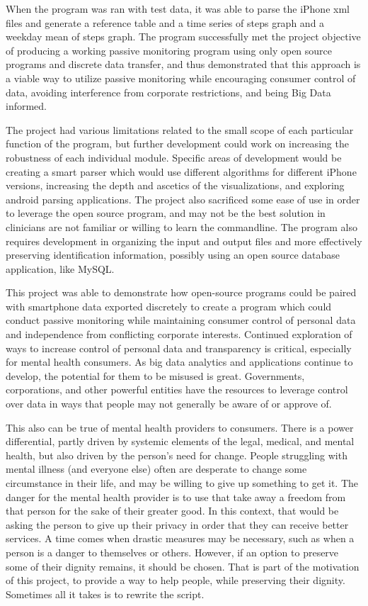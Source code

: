 \documentclass[sigconf]{acmart}
\begin{document}
When the program was ran with test data, it was able to parse the iPhone xml files and generate a reference table and a time series of steps graph and a weekday mean of steps graph. The program successfully met the project objective of producing a working passive monitoring program using only open source programs and discrete data transfer, and thus demonstrated that this approach is a viable way to utilize passive monitoring while encouraging consumer control of data, avoiding interference from corporate restrictions, and being Big Data informed. 

The project had various limitations related to the small scope of each particular function of the program, but further development could work on increasing the robustness of each individual module. Specific areas of development would be creating a smart parser which would use different algorithms for different iPhone versions, increasing the depth and ascetics of the visualizations, and exploring android parsing applications. 
The project also sacrificed some ease of use in order to leverage the open source program, and may not be the best solution in clinicians are not familiar or willing to learn the commandline. The program also requires development in organizing the input and output files and more effectively preserving identification information, possibly using an open source database application, like MySQL. 

This project was able to demonstrate how open-source programs could be paired with smartphone data exported discretely to create a program which could conduct passive monitoring while maintaining consumer control of personal data and independence from conflicting corporate interests. Continued exploration of ways to increase control of personal data and transparency is critical, especially for mental health consumers. As big data analytics and applications continue to develop, the potential for them to be misused is great. Governments, corporations, and other powerful entities have the resources to leverage control over data in ways that people may not generally be aware of or approve of. 

This also can be true of mental health providers to consumers. There is a power differential, partly driven by systemic elements of the legal, medical, and mental health, but also driven by the person's need for change. People struggling with mental illness (and everyone else) often are desperate to change some circumstance in their life, and may be willing to give up something to get it. The danger for the mental health provider is to use that take away a freedom from that person for the sake of their greater good. In this context, that would be asking the person to give up their privacy in order that they can receive better services. A time comes when drastic measures may be necessary, such as when a person is a danger to themselves or others. However, if an option to preserve some of their dignity remains, it should be chosen. That is part of the motivation of this project, to provide a way to help people, while preserving their dignity. Sometimes all it takes is to rewrite the script. 
\end{document}
